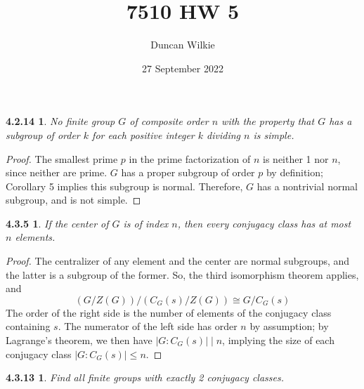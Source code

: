 \documentclass{article}
\title{7510 HW 5}
\author{Duncan Wilkie}
\date{27 September 2022}
\newtheorem*{4.2.14}{4.2.14}
\newtheorem*{4.3.5}{4.3.5}
\newtheorem*{4.3.13}{4.3.13}
\begin{document}
\maketitle

\begin{4.2.14}
  No finite group $G$ of composite order $n$ with the property that $G$ has a subgroup of order $k$ for each positive integer $k$ dividing $n$
  is simple.
\end{4.2.14}

\begin{proof}
  The smallest prime $p$ in the prime factorization of $n$ is neither 1 nor $n$, since neither are prime.
  $G$ has a proper subgroup of order $p$ by definition; Corollary 5 implies this subgroup is normal.
  Therefore, $G$ has a nontrivial normal subgroup, and is not simple.
\end{proof}

\begin{4.3.5}
  If the center of $G$ is of index $n$, then every conjugacy class has at most $n$ elements.
\end{4.3.5}

\begin{proof}
  The centralizer of any element and the center are normal subgroups, and the latter is a subgroup of the former.
  So, the third isomorphism theorem applies, and
  \[
    (G / Z(G)) / (C_{G}(s) / Z(G)) \cong G / C_{G}(s)
  \]
  The order of the right side is the number of elements of the conjugacy class containing $s$.
  The numerator of the left side has order $n$ by assumption; by Lagrange's theorem, we then have $|G : C_{G}(s)| \mid n$,
  implying the size of each conjugacy class $|G: C_{G}(s)| \leq n$.
\end{proof}

\begin{4.3.13}
  Find all finite groups with exactly 2 conjugacy classes.
\end{4.3.13}
\end{document}
